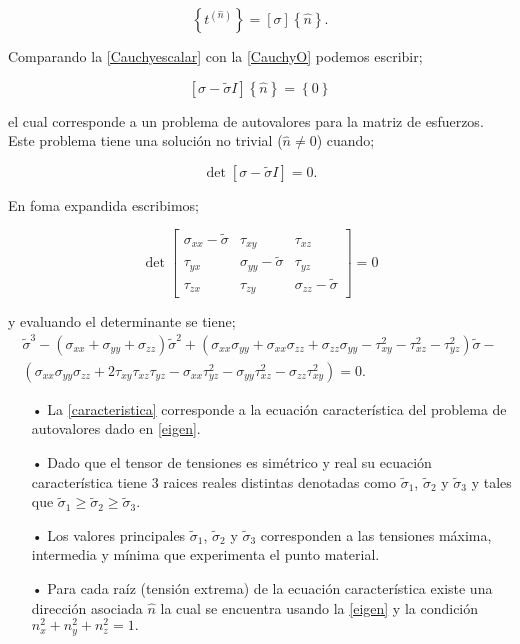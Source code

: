 \documentclass[../notas medios.tex]{subfiles}
\begin{document}
\begin{equation}
\left\{ {{t^{(\hat n)}}} \right\} = \left[ \sigma  \right]\left\{ {\hat n} \right\}.
\label{CauchyO}
\end{equation}

Comparando la \cref{Cauchyescalar} con la \cref{CauchyO} podemos escribir;

\begin{equation}
\left[ {\sigma  - \tilde \sigma I} \right]\left\{ {\hat n} \right\} = \left\{ 0 \right\}
\label{eigen}
\end{equation}

el cual corresponde a un problema de autovalores para la matriz de esfuerzos. Este problema tiene una solución no trivial ($\hat{n}\neq 0$) cuando;

\[\det \left[ {\sigma  - \tilde \sigma I} \right] = 0.\]

En foma expandida escribimos;

\[\det \left[ {\begin{array}{*{20}{c}}
{{\sigma _{xx}} - \tilde \sigma }&{{\tau _{xy}}}&{{\tau _{xz}}}\\
{{\tau _{yx}}}&{{\sigma _{yy}} - \tilde \sigma }&{{\tau _{yz}}}\\
{{\tau _{zx}}}&{{\tau _{zy}}}&{{\sigma _{zz}} - \tilde \sigma }
\end{array}} \right] = 0\]

y evaluando el determinante se tiene;
\begin{align}
{{\tilde \sigma }^3} - ({\sigma _{xx}} + {\sigma _{yy}} + {\sigma _{zz}}){{\tilde \sigma }^2} + ({\sigma _{xx}}{\sigma _{yy}} + {\sigma _{xx}}{\sigma _{zz}} + {\sigma _{zz}}{\sigma _{yy}} - \tau _{xy}^2 - \tau _{xz}^2 - \tau _{yz}^2)\tilde \sigma  - \nonumber \\
 ({\sigma _{xx}}{\sigma _{yy}}{\sigma _{zz}} + 2{\tau _{xy}}{\tau _{xz}}{\tau _{yz}} - {\sigma _{xx}}\tau _{yz}^2 - {\sigma _{yy}}\tau _{xz}^2 - {\sigma _{zz}}\tau _{xy}^2) = 0.
\label{caracteristica}
\end{align}

\begin{itemize}
\item[•] La \cref{caracteristica} corresponde a la ecuación  característica del problema de autovalores dado en \cref{eigen}.
\item[•] Dado que el tensor de tensiones es simétrico y real su ecuación característica tiene 3 raices reales distintas denotadas como ${{\tilde \sigma }_1}$, ${{\tilde \sigma }_2}$ y ${{\tilde \sigma }_3}$ y tales que ${{\tilde \sigma }_1} \geq{{\tilde \sigma }_2} \geq {{\tilde \sigma }_3}$.
\item[•] Los valores principales ${{\tilde \sigma }_1}$, ${{\tilde \sigma }_2}$ y ${{\tilde \sigma }_3}$ corresponden a las tensiones máxima, intermedia y mínima que experimenta el punto material. 
\item[•] Para cada raíz (tensión extrema) de la ecuación característica existe una dirección asociada $\hat{n}$ la cual se encuentra usando la \cref{eigen} y la condición $n_x^2 + n_y^2 + n_z^2 = 1.$
\end{itemize}
\end{document}
